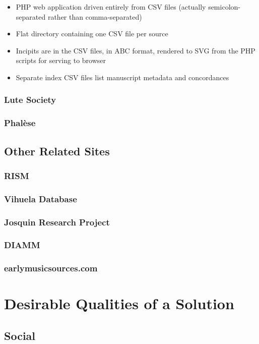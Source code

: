 \documentclass[twocolumn,10pt]{paper}
\begin{document}
\begin{sloppypar}
  \begin{itemize}
  \item PHP web application driven entirely from CSV files (actually
    semicolon-separated rather than comma-separated)
  \item Flat directory containing one CSV file per source
  \item Incipits are in the CSV files, in ABC format, rendered to SVG
    from the PHP scripts for serving to browser
  \item Separate index CSV files list manuscript metadata and
    concordances
  \end{itemize}
    
  \subsubsection{Lute Society}
  \subsubsection{Phal\`ese}

  \subsection{Other Related Sites}
  
  \subsubsection{RISM}
  \subsubsection{Vihuela Database}
  \subsubsection{Josquin Research Project}
  \subsubsection{DIAMM}
  \subsubsection{earlymusicsources.com}

  \section{Desirable Qualities of a Solution}
  \subsection{Social}


\end{sloppypar}
\end{document}

